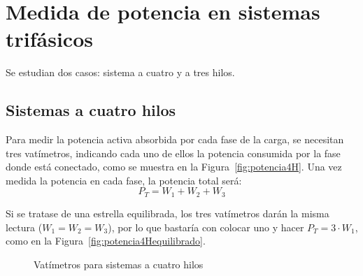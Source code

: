 	\section{Medida de potencia en sistemas trifásicos} 
	
	Se estudian dos casos: sistema a cuatro y a tres hilos.
	
	\subsection{Sistemas a cuatro hilos}
	Para medir la potencia activa absorbida por cada fase de la carga, se necesitan tres vatímetros, indicando cada uno de ellos la potencia consumida por la fase donde está conectado, como se muestra en la Figura~\ref{fig:potencia4H}. Una vez medida la potencia en cada fase, la potencia total será:
	\begin{equation}
		\boxed{P_T=W_1+W_2+W_3}
	\end{equation}
	
	\begin{remark}
	    Si se tratase de una estrella equilibrada, los tres vatímetros darán la misma lectura ($W_1=W_2=W_3$), por lo que bastaría con colocar uno y hacer $P_T=3\cdot W_1$, como en la Figura~\ref{fig:potencia4Hequilibrado}.
	\end{remark}
	\begin{figure}[H]
		\centering
		\hfill
		\caption{Vatímetros para sistemas a cuatro hilos}
		\label{fig:vatimetro4hilos}
	\end{figure}
	
